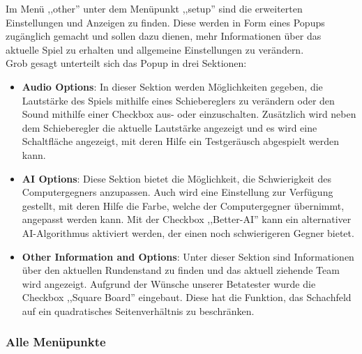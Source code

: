 \documentclass[12pt,a4paper]{article}
\begin{document}
	Im Menü ,,other'' unter dem Menüpunkt ,,setup'' sind die erweiterten Einstellungen und Anzeigen zu finden. Diese werden in Form eines Popups zugänglich gemacht und sollen dazu dienen, mehr Informationen über das aktuelle Spiel zu erhalten und allgemeine Einstellungen zu verändern. \\
Grob gesagt unterteilt sich das Popup in drei Sektionen: \\
\begin{itemize}

	\item{\textbf{Audio Options}: In dieser Sektion werden Möglichkeiten gegeben, die Lautstärke des Spiels mithilfe eines Schiebereglers zu verändern oder den Sound mithilfe einer Checkbox aus- oder einzuschalten. Zusätzlich wird neben dem Schieberegler die aktuelle Lautstärke angezeigt und es wird eine Schaltfläche angezeigt, mit deren Hilfe ein Testgeräusch abgespielt werden kann. } 

	\item{\textbf{AI Options}: Diese Sektion bietet die Möglichkeit, die Schwierigkeit des Computergegners anzupassen. Auch wird eine Einstellung zur Verfügung gestellt, mit deren Hilfe die Farbe, welche der Computergegner übernimmt, angepasst werden kann. Mit der Checkbox ,,Better-AI'' kann ein alternativer AI-Algorithmus aktiviert werden, der einen noch schwierigeren Gegner bietet. }

	\item{\textbf{Other Information and Options}: Unter dieser Sektion sind Informationen über den aktuellen Rundenstand zu finden und das aktuell ziehende Team wird angezeigt. Aufgrund der Wünsche unserer Betatester wurde die Checkbox ,,Square Board'' eingebaut. Diese hat die Funktion, das Schachfeld auf ein quadratisches Seitenverhältnis zu beschränken.}
	
\end{itemize}

	
	\subsubsection{Alle Menüpunkte}
\end{document}
